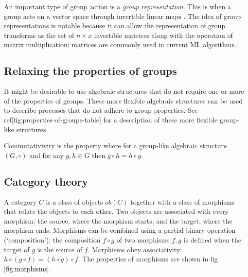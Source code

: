 An important type of group action is a \textit{group representation}.
This is when a group acts on a vector space through invertible linear maps \autocite{Mathworld-group}.
The idea of group representations is notable because it can allow the representation of group transforms as the set of $n\times x$ invertible matrices along with the operation of matrix multiplication; matrices are commonly used in current ML algorithms.


\subsection{Relaxing the properties of groups}\label{sec:Relaxing the properties of groups}

It might be desirable to use algebraic structures that do not require one or more of the properties of groups.
These more flexible algebraic structures can be used to describe processes that do not adhere to group properties.
See ref[fig:properties-of-groups-table] for a description of these more flexible group-like structures.



Commutativivity is the property where for a group-like algebraic structure $(G, \circ)$ and for any $g,h \in G$ then $g \circ h = h \circ g$.

\subsection{Category theory}

A category $C$ is a class of objects $ob(C)$ together with a class of morphisms that relate the objects to each other.
Two objects are associated with every morphism: the source, where the morphism starts, and the target, where the morphism ends.
Morphisms can be combined using a partial binary operation (`composition'); the composition $f \circ g$ of two morphisms $f, g$ is defined when the target of $g$ is the source of $f$.
Morphisms obey associativity: $h \circ (g \circ f) = (h \circ g) \circ f$.
The properties of morphisms are shown in fig \ref{fig:morphisms}.

